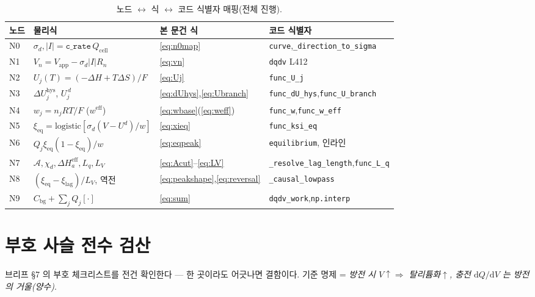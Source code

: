\documentclass[11pt,a4paper]{article}
\newcommand{\dd}{\mathrm{d}}
\newcommand{\eff}{\mathrm{eff}}
\newcommand{\eq}{\mathrm{eq}}
\newcommand{\app}{\mathrm{app}}
\newcommand{\cell}{\mathrm{cell}}
\newcommand{\bg}{\mathrm{bg}}
\newcommand{\hys}{\mathrm{hys}}
\newcommand{\code}[1]{\texttt{#1}}
\begin{document}
\begin{table}[t]
\centering
\renewcommand{\arraystretch}{1.3}
\caption{노드 $\leftrightarrow$ 식 $\leftrightarrow$ 코드 식별자 매핑(전체 진행).}
\label{tab:nodemap}
\begin{tabular}{l l l l}
\toprule
노드 & 물리식 & 본 문건 식 & 코드 식별자 \\
\midrule
N0 & $\sigma_d,|I|=\code{c\_rate}\,Q_\cell$ & \eqref{eq:n0map} & \code{curve},\code{\_direction\_to\_sigma} \\
N1 & $V_n=V_\app-\sigma_d|I|R_n$ & \eqref{eq:vn} & \code{dqdv} L412 \\
N2 & $U_j(T)=(-\Delta H+T\Delta S)/F$ & \eqref{eq:Uj} & \code{func\_U\_j} \\
N3 & $\Delta U_j^\hys$, $U_j^{\,d}$ & \eqref{eq:dUhys},\eqref{eq:Ubranch} & \code{func\_dU\_hys},\code{func\_U\_branch} \\
N4 & $w_j=n_jRT/F$ ($w^\eff$) & \eqref{eq:wbase}(\eqref{eq:weff}) & \code{func\_w},\code{func\_w\_eff} \\
N5 & $\xi_\eq=\mathrm{logistic}[\sigma_d(V-U^d)/w]$ & \eqref{eq:xieq} & \code{func\_ksi\_eq} \\
N6 & $Q_j\xi_\eq(1-\xi_\eq)/w$ & \eqref{eq:eqpeak} & \code{equilibrium}, 인라인 \\
N7 & $\mathcal A,\chi_d,\Delta H_a^\eff,L_q,L_V$ & \eqref{eq:Acut}--\eqref{eq:LV} & \code{\_resolve\_lag\_length},\code{func\_L\_q} \\
N8 & $(\xi_\eq-\xi_\mathrm{lag})/L_V$, 역전 & \eqref{eq:peakshape},\eqref{eq:reversal} & \code{\_causal\_lowpass} \\
N9 & $C_\bg+\sum_jQ_j[\cdot]$ & \eqref{eq:sum} & \code{dqdv\_work},\code{np.interp} \\
\bottomrule
\end{tabular}
\end{table}

\section{부호 사슬 전수 검산}\label{sec:signcheck}
브리프 §7 의 부호 체크리스트를 전건 확인한다 — 한 곳이라도 어긋나면 결함이다. 기준 명제 = \emph{방전 시
$V\!\uparrow\Rightarrow$ 탈리튬화$\uparrow$, 충전 $\dd Q/\dd V$ 는 방전의 거울(양수)}.
\end{document}
